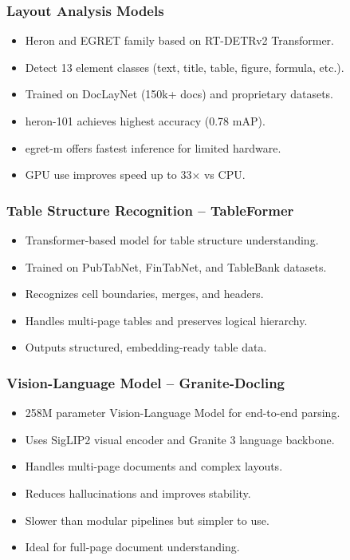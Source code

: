 \begin{frame}[fragile]\frametitle{Layout Analysis Models}
      \begin{itemize}
        \item Heron and EGRET family based on RT-DETRv2 Transformer.
        \item Detect 13 element classes (text, title, table, figure, formula, etc.).
        \item Trained on DocLayNet (150k+ docs) and proprietary datasets.
        \item heron-101 achieves highest accuracy (0.78 mAP).
        \item egret-m offers fastest inference for limited hardware.
        \item GPU use improves speed up to 33× vs CPU.
      \end{itemize}
\end{frame}

\begin{frame}[fragile]\frametitle{Table Structure Recognition – TableFormer}
      \begin{itemize}
        \item Transformer-based model for table structure understanding.
        \item Trained on PubTabNet, FinTabNet, and TableBank datasets.
        \item Recognizes cell boundaries, merges, and headers.
        \item Handles multi-page tables and preserves logical hierarchy.
        \item Outputs structured, embedding-ready table data.
      \end{itemize}
\end{frame}

\begin{frame}[fragile]\frametitle{Vision-Language Model – Granite-Docling}
      \begin{itemize}
        \item 258M parameter Vision-Language Model for end-to-end parsing.
        \item Uses SigLIP2 visual encoder and Granite 3 language backbone.
        \item Handles multi-page documents and complex layouts.
        \item Reduces hallucinations and improves stability.
        \item Slower than modular pipelines but simpler to use.
        \item Ideal for full-page document understanding.
      \end{itemize}
\end{frame}

